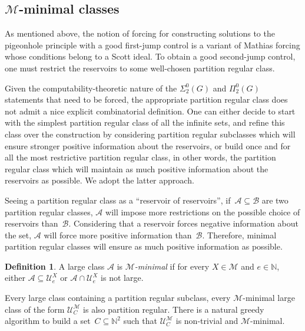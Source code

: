 \documentclass{article}
\def\NN{\mathbb{N}}
\def\U{\mathcal{U}}
\def\A{\mathcal{A}}
\def\B{\mathcal{B}}
\def\M{\mathcal{M}}
\def\qt#1{``#1''}%
\numberwithin{theorem}{section}
\theoremstyle{definition}
\newtheorem{definition}[theorem]{Definition}
\begin{document}
\subsection{$\M$-minimal classes}

As mentioned above, the notion of forcing for constructing solutions to the pigeonhole principle with a good first-jump control is a variant of Mathias forcing whose conditions belong to a Scott ideal. To obtain a good second-jump control, one must restrict the reservoirs to some well-chosen partition regular class. 

Given the computability-theoretic nature of the $\Sigma^0_2(G)$ and $\Pi^0_2(G)$ statements that need to be forced, the appropriate partition regular class does not admit a nice explicit combinatorial definition. One can either decide to start with the simplest partition regular class of all the infinite sets, and refine this class over the construction by considering partition regular subclasses which will ensure stronger positive information about the reservoirs, or build once and for all the most restrictive partition regular class, in other words, the partition regular class which will maintain as much positive information about the reservoirs as possible. We adopt the latter approach.

Seeing a partition regular class as a \qt{reservoir of reservoirs}, if~$\A \subseteq \B$ are two partition regular classes, $\A$ will impose more restrictions on the possible choice of reservoirs than~$\B$. Considering that a reservoir forces negative information about the set, $\A$ will force more positive information than~$\B$. Therefore, minimal partition regular classes will ensure as much positive information as possible.


\begin{definition}
A large class $\A$ is \emph{$\M$-minimal} if for every $X \in \M$ and $e \in \NN$, either $\A \subseteq \U_e^X$ or $\A \cap \U_e^X$ is not large.
\end{definition}

Every large class containing a partition regular subclass, every $\M$-minimal large class of the form $\U^\M_C$ is also partition regular.
There is a natural greedy algorithm to build a set~$C \subseteq \NN^2$ such that $\U_C^\M$ is non-trivial and $\M$-minimal.
\end{document}
